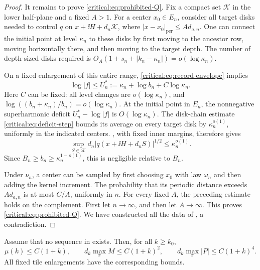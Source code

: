 \begin{proof}
It remains to prove \eqref{critical:eq:prohibited-Q}. Fix a compact
set \(\mathcal K\) in the lower half-plane and a fixed \(A>1\).
For a center \(x_0\in E_n\), consider all target disks needed to
control \(q\) on \(x+\ii H+d_n\mathcal K\), where
\(|x-x_0|_{\mathrm{per}}\le A d_{a,n}\). One can connect the
initial point at level \(\kappa_n\) to these disks by first moving
to the ancestor row, moving horizontally there, and then moving to
the target depth. The number of depth-sized disks required is
\(O_A(1+s_n+|k_n-\kappa_n|)=o(\log\kappa_n)\).

On a fixed enlargement of this entire range,
\eqref{critical:eq:record-envelope} implies
\[
 \log|f|\le U_n^*:=\kappa_n+\log b_n+C\log\kappa_n.
\]
Here \(C\) can be fixed: all level changes are
\(o(\log\kappa_n)\), and
\(\log((b_n+\kappa_n)/b_n)=o(\log\kappa_n)\).
At the initial point in \(E_n\), the nonnegative superharmonic
deficit \(U_n^*-\log|f|\) is \(O(\log\kappa_n)\).
The disk-chain estimate \eqref{critical:eq:deficit-step} bounds its
average on every target disk by \(\kappa_n^{o(1)}\), uniformly in
the indicated centers. , with fixed inner
margins, therefore gives
\[
 \sup_{S\in\mathcal K}d_n
       |q(x+\ii H+d_nS)|^{1/2}\le\kappa_n^{o(1)}.
\]
Since \(B_n\ge b_n\ge\kappa_n^{1-o(1)}\), this is negligible
relative to \(B_n\).

Under \(\nu_n\), a center can be sampled by first choosing
\(x_0\) with law \(\omega_n\) and then adding the kernel
increment. The probability that its periodic distance exceeds
\(A d_{a,n}\) is at most \(C/A\), uniformly in \(n\).
For every fixed \(A\), the preceding estimate holds on the
complement. First let \(n\to\infty\), and then let \(A\to\infty\).
This proves \eqref{critical:eq:prohibited-Q}. We have constructed all
the data of , a contradiction.
\end{proof}

\begin{corollary}\label{cor:critical-polynomial-bounds}
Assume that no sequence in  exists.
Then, for all \(k\ge k_0\),
\begin{equation}\label{critical:eq:polynomial-bounds}
 \mu(k)\le C(1+k),\qquad
 d_k\max_x M\le C(1+k)^2,\qquad
 d_k\max_x|P|\le C(1+k)^4.
\end{equation}
All fixed tile enlargements have the corresponding bounds.
\end{corollary}

